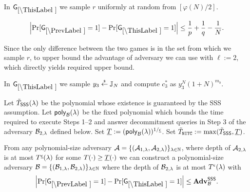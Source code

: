In $\games_\thisgame$ we sample $r$ uniformly at random from $[\varphi(N)/2]$. 

\begin{lemma}
\[
\left|\Pr[\games_\prevgame = 1] - \Pr[\games_\thisgame = 1]\right| \leq \frac{1}{p}+\frac{1}{q}-\frac{1}{N}.
\]
\end{lemma}
Since the only difference between the two games is in the set from which we sample $r$, to upper bound the advantage of adversary we can use  with $\ell:=2$, which directly yields required upper bound.

%


In $\games_\thisgame$ we sample $y_3 \stackrel{{\scriptscriptstyle\$}}{\leftarrow} \mathbb{J}_N$ and compute $c_3^*$ as $y_3^N (1+N)^{m_b}$.

Let $\tilde{T}_\mathsf{SSS}(\lambda)$ be the polynomial whose existence is guaranteed by the SSS assumption.
Let $\mathsf{poly}_{\mathcal{B}}(\lambda)$ be the fixed polynomial which bounds the time required to execute Steps 1--2 and answer decommitment queries in Step 3 of the adversary $\mathcal{B}_{2, \lambda}$ defined below. Set $\underline{T} := (\mathsf{poly}_{\mathcal{B}}(\lambda))^{1 / \underline{\epsilon}}$.  Set $\tilde{T}_{\mathtt{NITC}} := \max(\tilde{T}_\mathsf{SSS}, \underline{T})$.
\begin{lemma}
From any polynomial-size adversary $\mathcal{A} = \{(\mathcal{A}_{1,\lambda}, \mathcal{A}_{2, \lambda})\}_{\lambda \in \mathbb{N}}$, where depth of $\mathcal{A}_{2, \lambda}$ is at most $T^{\underline{\epsilon}}(\lambda)$ for some $T(\cdot) \geq \underline{T}(\cdot)$ we can construct a polynomial-size adversary $\mathcal{B} = \{(\mathcal{B}_{1,\lambda}, \mathcal{B}_{2, \lambda})\}_{\lambda \in \mathbb{N}}$ where the depth of $\mathcal{B}_{2, \lambda}$ is at most $T^{\epsilon}(\lambda)$ with
\[
\left|\Pr[\games_\prevgame = 1] - \Pr[\games_\thisgame = 1]\right| \leq \advtg_\advB^\sss.
\]
\end{lemma}

